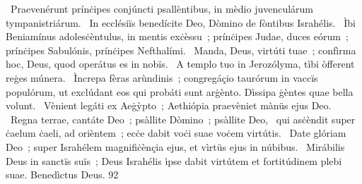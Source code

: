 {~Praevenérunt prínċipes conjúncti psallèntibus, in mèdio juvenculárum tympanistriárum.
~In ecclésiïs benedícite Deo, Dòmino de fòntibus Israhélis.
~Ìbi Beniamínus adolesċèntulus, in mentis exċèssu~; prínċipes Judae, duces eórum~; prínċipes Sabulónis, prínċipes Nefthalími.
~Manda, Deus, virtúti tuae~; confìrma hoc, Deus, quod operátus es in nobïs.
~A templo tuo in Jerozólyma, tìbi òfferent reġes múnera.
~Ìncrepa fèras arùndinis~; congregáçio taurórum in vaccïs populórum, ut exclúdant eos qui probáti sunt arġènto. Dìssipa ġèntes quae bella volunt.
~Vènient legáti ex Aeġỳpto~; Aethiópia praevèniet mànüs ejus Deo.
~Regna terrae, cantáte Deo~; psàllite Dòmino~; psàllite Deo,
~qui asċèndit super ċaelum ċaeli, ad orièntem~; ecċe dabit voċi suae voċem virtútis.
~Date glóriam Deo~; super Israhélem magnifiċènçia ejus, et vìrtüs ejus in núbibus.
~Mirábilis Deus in sanctïs suïs~; Deus Israhélis ìpse dabit virtútem et fortitúdinem plebi suae. Benedìctus Deus.}
{9}{2}
